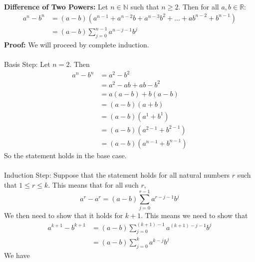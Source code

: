 \documentclass{article}
\begin{document}
	\textbf{Difference of Two Powers:} Let $n \in \mathbb{N}$ such that $n \geq 2$. Then for all $a, b \in \mathbb{R}$:
	\begin{align*}
		a^n - b^n &= (a - b)(a^{n-1} + a^{n-2}b + a^{n-3}b^2 + \ldots + ab^{n-2} + b^{n-1}) \\
		          &= (a - b)\sum_{j=0}^{n-1}{a^{n-j-1}b^j}
	\end{align*}
	\textbf{Proof:} We will proceed by complete induction. \\\\
	Basis Step: Let $n = 2$. Then
	\begin{align*}
		a^n - b^n &= a^2 - b^2 \\
		          &= a^2 -ab + ab - b^2 \tag{Adding 0}\\
		          &= a(a - b) + b(a - b) \tag{Factor out a and b}\\
		          &= (a - b)(a + b) \tag{Factor out a - b} \\
		          &= (a - b)(a^1 + b^1) \\
		          &= (a - b)(a^{2-1} + b^{2-1}) \\
		          &= (a - b)(a^{n-1} + b^{n-1})
	\end{align*}
	So the statement holds in the base case. \\\\
	Induction Step: Suppose that the statement holds for all natural numbers $r$ such that $1 \leq r \leq k$. This means that for all such $r$,
	$$a^r - a^r = (a - b)\sum_{j=0}^{r-1}{a^{r-j-1}b^j}$$
	We then need to show that it holds for $k + 1$. This means we need to show that
	\begin{align*}
		a^{k+1} - b^{k+1} &= (a-b)\sum_{j=0}^{(k + 1) -1}{a^{(k+1)-j-1}b^{j}} \\
		                  &= (a-b)\sum_{j=0}^{k}{a^{k-j}b^{j}}
	\end{align*}
	We have
\end{document}
